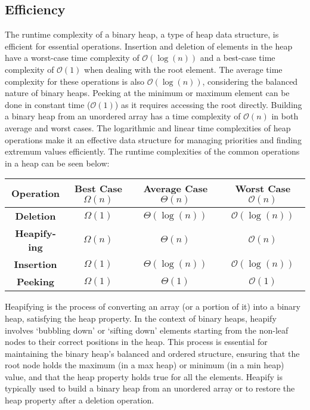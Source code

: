\subsection*{Efficiency}

The runtime complexity of a binary heap, a type of heap data structure, is efficient for essential operations. Insertion and deletion of elements in the heap have a worst-case time complexity of 
$\mathcal{O}(\log{(n)})$ and a best-case time complexity of $\mathcal{O}(1)$ when dealing with the root element. The average time complexity for these operations is also $\mathcal{O}(\log{(n)})$, 
considering the balanced nature of binary heaps. Peeking at the minimum or maximum element can be done in constant time ($\mathcal{O}(1)$) as it requires accessing the root directly. Building a binary 
heap from an unordered array has a time complexity of $\mathcal{O}(n)$ in both average and worst cases. The logarithmic and linear time complexities of heap operations make it an effective data structure 
for managing priorities and finding extremum values efficiently. The runtime complexities of the common operations in a heap can be seen below:

\begin{center}
    \begin{tabular}[ht]{|c|c|c|c|}
        \hline \textbf{Operation} & \textbf{Best Case} $\Omega(n)$ & \textbf{Average Case} $\Theta(n)$ & \textbf{Worst Case} $\mathcal{O}(n)$ \\ \hline
        \textbf{Deletion} & $\Omega(1)$ & $\Theta(\log{(n)})$ & $\mathcal{O}(\log{(n)})$ \\ \hline
        \textbf{Heapify-ing} & $\Omega(n)$ & $\Theta(n)$ & $\mathcal{O}(n)$ \\ \hline
        \textbf{Insertion} & $\Omega(1)$ & $\Theta(\log{(n)})$ & $\mathcal{O}(\log{(n)})$ \\ \hline
        \textbf{Peeking} & $\Omega(1)$ & $\Theta(1)$ & $\mathcal{O}(1)$ \\ \hline
    \end{tabular}
\end{center}

\noindent Heapifying is the process of converting an array (or a portion of it) into a binary heap, satisfying the heap property. In the context of binary heaps, heapify involves `bubbling down' or 
`sifting down' elements starting from the non-leaf nodes to their correct positions in the heap. This process is essential for maintaining the binary heap's balanced and ordered structure, ensuring that 
the root node holds the maximum (in a max heap) or minimum (in a min heap) value, and that the heap property holds true for all the elements. Heapify is typically used to build a binary heap from an 
unordered array or to restore the heap property after a deletion operation.

